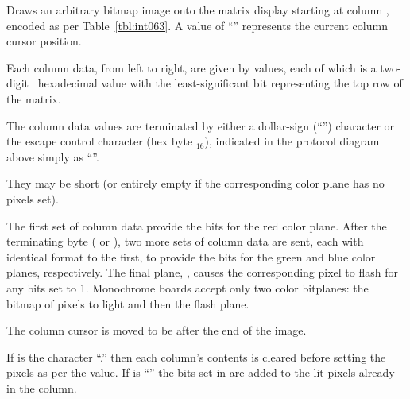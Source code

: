 Draws an arbitrary bitmap image onto the matrix display starting at column
, encoded as per Table~\ref{tbl:int063}. A  value of
``\z{\textasciitilde}'' represents the current column cursor position.

Each column data, from left to right, are given by  values,
each of which is a two-digit \ascii\ hexadecimal value with the 
least-significant bit representing the top row of the matrix.

The column data values are terminated by either a dollar-sign (``\z{\$}'') character or the
escape control character (hex byte $_{16}$), indicated in the protocol diagram above
simply as ``\z{\$}''. 

They may be short (or entirely empty if the corresponding color plane has no pixels set).

The first set of column data provide the bits for the red color plane. After the terminating
byte (\z{\$} or ), two more sets of column data are sent, each with identical format to the first, to provide
the bits for the green and blue color planes, respectively. The final plane, ,
causes the corresponding pixel to flash for any bits set to 1. Monochrome boards accept only
two color bitplanes: the bitmap of pixels to light and then the flash plane.

The column cursor is moved to be after the end of the image.

If  is the character ``\z.'' then each column's contents is cleared before
setting the pixels as per the  value. If  is ``'' the bits
set in  are added to the lit pixels already in the column.


